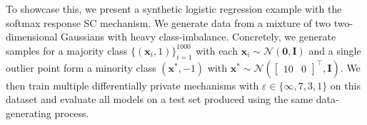 


To showcase this, we present a synthetic logistic regression example with the softmax response SC mechanism. We generate data from a mixture of two two-dimensional Gaussians with heavy class-imbalance. Concretely, we generate samples for a majority class $\{(\bm{x}_i,1)\}_{i=1}^{1000}$ with each $\bm{x}_i \sim \mathcal{N}(\bm{0}, \bm{I})$ and a single outlier point form a minority class $(\bm{x}^*,-1)$ with $\bm{x}^* \sim \mathcal{N}(\begin{bmatrix}10 & 0\end{bmatrix}^\top, \bm{I})$. We then train multiple differentially private mechanisms with $\varepsilon \in \{\infty, 7,3,1\}$  on this dataset and evaluate all models on a test set produced using the same data-generating process. %

